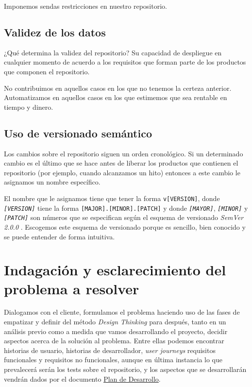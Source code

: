 Imponemos sendas restricciones en nuestro repositorio.

\subsection{Validez de los datos}

¿Qué determina la validez del repositorio? Su capacidad de despliegue en cualquier
momento de acuerdo a los requisitos que forman parte de los productos que componen
el repositorio.

No contribuimos en aquellos casos en los que no tenemos la certeza anterior.
Automatizamos en aquellos casos en los que estimemos que sea rentable en tiempo
y dinero.

\subsection{Uso de versionado semántico}

Los cambios sobre el repositorio siguen un orden cronológico.
Si un determinado cambio es el último que se hace antes de
liberar los productos que contienen el repositorio (por ejemplo,
cuando alcanzamos un hito) entonces a este cambio le asignamos
un nombre específico.

El nombre que le asignamos tiene que tener la forma \texttt{v[VERSION]},
donde \textit{\texttt{[VERSION]}} tiene la forma \texttt{[MAJOR].[MINOR].[PATCH]} y donde
\textit{\texttt{[MAYOR]}}, \textit{\texttt{[MINOR]}} y \textit{\texttt{[PATCH]}} son números que se
especifican según el esquema de versionado \textit{SemVer 2.0.0} \cite{SemVer}.
Escogemos este esquema de versionado porque es sencillo, bien conocido y se puede
entender de forma intuitiva.

\section{Indagación y esclarecimiento del problema a resolver}

Dialogamos con el cliente, formulamos el problema haciendo uso de las fases de
empatizar y definir del método \textit{Design Thinking} para después, tanto en un análisis
previo como a medida que vamos desarrollando el proyecto, decidir aspectos acerca de la
solución al problema. Entre ellas podemos encontrar historias de usuario, historias de
desarrollador, \textit{user journeys} requisitos funcionales y
requisitos no funcionales, aunque en última instancia lo que prevalecerá serán los
tests sobre el repositorio, y los aspectos que se desarrollarán vendrán dados por
el documento \hyperref[sec:plan_de_desarrollo]{Plan de Desarrollo}.

